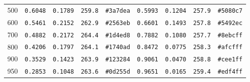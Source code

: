 \documentclass[11pt,titlepage]{article}
\begin{document}
\begin{longtable}{@{}r r r r l r r r l@{}}
500 & \texttt{0.6048} & \texttt{0.1789} & \texttt{259.8} & \texttt{\#3a7dea} & \texttt{0.5993} & \texttt{0.1204} & \texttt{257.9} & \texttt{\#5080c7} \\
600 & \texttt{0.5461} & \texttt{0.2152} & \texttt{262.9} & \texttt{\#2563eb} & \texttt{0.6601} & \texttt{0.1493} & \texttt{257.8} & \texttt{\#5492ec} \\
700 & \texttt{0.4882} & \texttt{0.2172} & \texttt{264.4} & \texttt{\#1d4ed8} & \texttt{0.7882} & \texttt{0.1080} & \texttt{257.7} & \texttt{\#8ebcff} \\
800 & \texttt{0.4206} & \texttt{0.1797} & \texttt{264.1} & \texttt{\#1740ad} & \texttt{0.8472} & \texttt{0.0775} & \texttt{258.3} & \texttt{\#afcfff} \\
900 & \texttt{0.3529} & \texttt{0.1423} & \texttt{263.9} & \texttt{\#123284} & \texttt{0.9061} & \texttt{0.0470} & \texttt{258.8} & \texttt{\#cee1ff} \\
950 & \texttt{0.2853} & \texttt{0.1048} & \texttt{263.6} & \texttt{\#0d255d} & \texttt{0.9651} & \texttt{0.0165} & \texttt{259.4} & \texttt{\#edf4ff} \\
\end{longtable}
\end{document}
